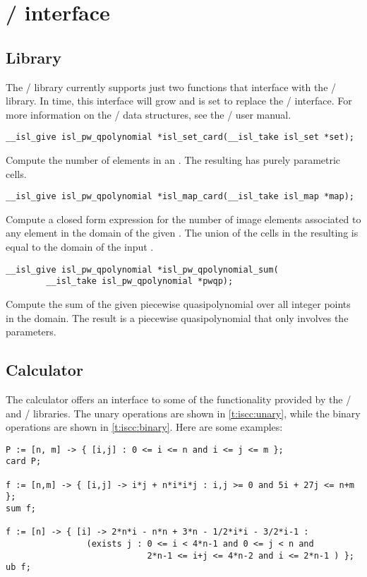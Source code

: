 \section{\protect\isl/ interface}

\subsection{Library}

The \barvinok/ library currently supports just two
functions that interface with the \isl/ library.
In time, this interface will grow and is set to replace
the \PolyLib/ interface.
For more information on the \isl/ data structures, see
the \isl/ user manual.

\begin{verbatim}
__isl_give isl_pw_qpolynomial *isl_set_card(__isl_take isl_set *set);
\end{verbatim}
Compute the number of elements in an .
The resulting  has purely parametric cells.

\begin{verbatim}
__isl_give isl_pw_qpolynomial *isl_map_card(__isl_take isl_map *map);
\end{verbatim}
Compute a closed form expression for the number of image elements
associated to any element in the domain of the given .
The union of the cells in the resulting 
is equal to the domain of the input .

\begin{verbatim}
__isl_give isl_pw_qpolynomial *isl_pw_qpolynomial_sum(
        __isl_take isl_pw_qpolynomial *pwqp);
\end{verbatim}
Compute the sum of the given piecewise quasipolynomial over
all integer points in the domain.  The result is a piecewise
quasipolynomial that only involves the parameters.

\subsection{Calculator}

The  calculator offers an interface to some
of the functionality provided by the \isl/ and \barvinok/
libraries.
The unary operations are shown in \autoref{t:iscc:unary},
while the binary operations are shown in \autoref{t:iscc:binary}.
Here are some examples:
\begin{verbatim}
P := [n, m] -> { [i,j] : 0 <= i <= n and i <= j <= m };
card P;

f := [n,m] -> { [i,j] -> i*j + n*i*i*j : i,j >= 0 and 5i + 27j <= n+m };
sum f;

f := [n] -> { [i] -> 2*n*i - n*n + 3*n - 1/2*i*i - 3/2*i-1 :
                (exists j : 0 <= i < 4*n-1 and 0 <= j < n and
                            2*n-1 <= i+j <= 4*n-2 and i <= 2*n-1 ) };
ub f;
\end{verbatim}

